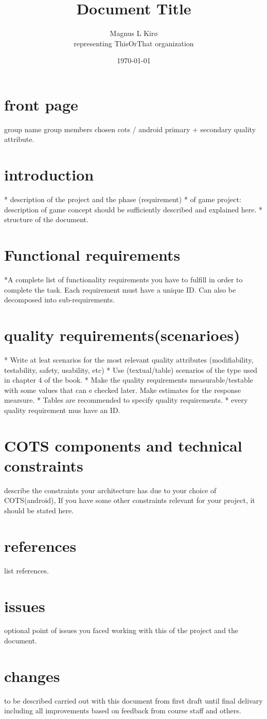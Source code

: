 \documentclass[12pt, a4paper]{article}
\title{Document Title}
\author{
        Magnus L Kirø \\
		representing ThisOrThat organization %
}
\date{\today}
\begin{document}
\maketitle
{}

\section{front page}
group name
group members
chosen cots / android
primary + secondary quality attribute.

\section{introduction}
* description of the project and the phase (requirement)
* of game project: description of game concept should be sufficiently described and explained here. 
* structure of the document. 

\section{Functional requirements}
*A complete list of functionality requirements you have to fulfill in order to complete the task. Each requirement must have a unique ID. Can also be decomposed into sub-requirements. 

\section{quality requirements(scenarioes)}
* Write at leat scenarios for the most relevant quality attributes (modifiability, testability, safety, usability, etc) 
* Use (textual/table) scenarios of the type used in chapter 4 of the book.
* Make the quality requirements measurable/testable with some values that can e checked later. Make estimates for the response mearsure. 
* Tables are recommended to specify quality requirements.
* every quality requirement mus have an ID.

\section{COTS components and technical constraints}
describe the constraints  your architecture has due to your choice of COTS(android), If you have some other constraints relevant for your project, it should be stated here. 

\section{references}
list references. 

\section{issues}
optional point of issues you faced working with this of the project and the document. 

\section{changes}
to be described carried out with this document from first draft until final delivary including all improvements based on feedback from course staff and others. 
\end{document}
